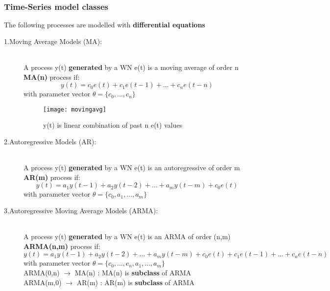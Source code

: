 \subsubsection{Time-Series model classes}
The following processes are modelled with \textbf{differential equations}
\begin{description}
\item[1.Moving Average Models (MA):]\hfill\\
A process y(t) \textbf{generated} by a WN e(t) is a moving average of order n   
 \textbf{MA(n)} process if: 
$$ y(t) = c_0e(t)+c_1e(t-1)+...+c_ne(t-n)$$ 
with parameter vector $ \theta = \{c_0 ,...,c_n\}$
\newpage
\begin{figure}[!ht]
  \centering
  \texttt{[image: movingavg]}
  \caption{y(t) is linear combination of past n e(t) values}
\end{figure}
\item[2.Autoregressive Models (AR):]\hfill\\
A process y(t) \textbf{generated} by a WN e(t) is an autoregressive of order m \textbf{AR(m)} process if:
$$ y(t) = a_1y(t-1)+a_2y(t-2)+...+a_my(t-m)+c_0e(t)$$ 
with parameter vector $ \theta = \{c_0,a_1,...,a_m\}$
\item[3.Autoregressive Moving Average Models (ARMA):]\hfill\\
A process y(t) \textbf{generated} by a WN e(t) is an ARMA of order (n,m) \textbf{ARMA(n,m)} process if:
$$ y(t) = a_1y(t-1)+a_2y(t-2)+...+a_my(t-m)+ c_0e(t)+c_1e(t-1)+...+c_ne(t-n)$$ 
with parameter vector $ \theta = \{c_0 ,...,c_n,a_1,...,a_m\}$\\
ARMA(0,n) $\to$ MA(n) : MA(n) is \textbf{subclass} of ARMA\\
ARMA(m,0) $\to$ AR(m) : AR(m) is \textbf{subclass} of ARMA
\end{description}
\newpage
